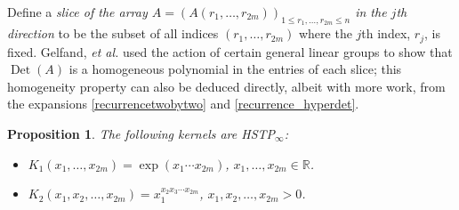 \documentclass[10pt,a4paper]{amsart}
\numberwithin{equation}{section}
\newtheorem{Proposition}[Theorem]{Proposition}
 { \theoremstyle{definition}
\newtheorem{Definition}[Theorem]{Definition}
\newtheorem{Note}[Theorem]{Note}
\newtheorem{Example}[Theorem]{Example}
\newtheorem{Remark}[Theorem]{Remark} }
\def\R{{\mathbb R}}
\def\Det{\operatorname{Det}}
\begin{document}
Define a {\it slice of the array $A = (A(r_1,\dots,r_{2m}))_{1 \le r_1,\dots,r_{2m} \le n}$ in the $j$th direction} to be the subset of all indices $(r_1,\dots,r_{2m})$ where the $j$th index, $r_j$, is fixed. Gelfand, \textit{et al.} \cite[Corollary~1.5\,(b)]{GKZ1} used the action of certain general linear groups to show that $\Det(A)$ is a homogeneous polynomial in the entries of each slice; this homogeneity property can also be deduced directly, albeit with more work, from the expansions \eqref{recurrencetwobytwo} and \eqref{recurrence_hyperdet}.


\begin{Proposition}
\label{prop_exponentialexample}
The following kernels are HSTP$_\infty$:
\begin{itemize}\itemsep=0pt
\item[$(i)$] $K_1(x_1,\dots,x_{2m}) = \exp(x_1 \cdots x_{2m})$, $x_1,\dots,x_{2m} \in \R$.

\item[$(ii)$] $K_2(x_1,x_2,\dots,x_{2m}) = x_1^{x_2 x_3 \cdots x_{2m}}$, $x_1,x_2,\dots,x_{2m} > 0$.
\end{itemize}
\end{Proposition}
\end{document}
